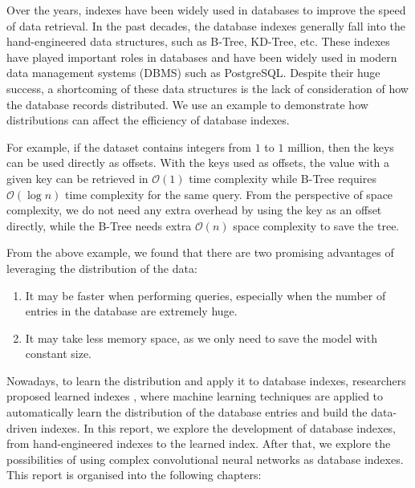 Over the years, indexes have been widely used in databases to improve the speed of data retrieval. In the past decades, the database indexes generally fall into the hand-engineered data structures, such as B-Tree, KD-Tree, etc. These indexes have played important roles in databases and have been widely used in modern data management systems (DBMS) such as PostgreSQL. Despite their huge success, a shortcoming of these data structures is the lack of consideration of how the database records distributed. We use an example to demonstrate how distributions can affect the efficiency of database indexes.

\begin{mscexample}
	For example, if the dataset contains integers from $1$ to $1$ million, then the keys can be used directly as offsets. With the keys used as offsets, the value with a given key can be retrieved in $\mathcal{O}(1)$ time complexity while B-Tree requires $\mathcal{O}(\log n)$ time complexity for the same query. From the perspective of space complexity, we do not need any extra overhead by using the key as an offset directly, while the B-Tree needs extra $\mathcal{O}(n)$ space complexity to save the tree.
\end{mscexample}

From the above example, we found that there are two promising advantages of leveraging the distribution of the data:
\begin{enumerate}
  \item It may be faster when performing queries, especially when the number of entries in the database are extremely huge.
  \item It may take less memory space, as we only need to save the model with constant size.
  \end{enumerate}

Nowadays, to learn the distribution and apply it to database indexes, researchers proposed learned indexes \cite{kraska2018case}, where machine learning techniques are applied to automatically learn the distribution of the database entries and build the data-driven indexes. In this report, we explore the development of database indexes, from hand-engineered indexes to the learned index. After that, we explore the possibilities of using complex convolutional neural networks as database indexes. This report is organised into the following chapters:

